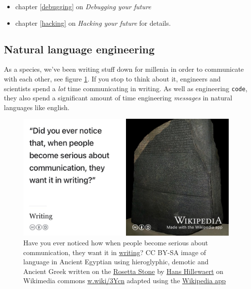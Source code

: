 \documentclass[
]{book}
\providecommand{\tightlist}{%
  \setlength{\itemsep}{0pt}\setlength{\parskip}{0pt}}
\begin{document}
\begin{enumerate}
  \begin{itemize}
  \tightlist
  \item
    chapter \ref{debugging} on \emph{Debugging your future}
  \item
    chapter \ref{hacking} on \emph{Hacking your future} for details.
  \end{itemize}
\end{enumerate}

\hypertarget{nle}{%
\subsection{Natural language engineering}\label{nle}}

As a species, we've been writing stuff down for millenia in order to communicate with each other, see figure \ref{fig:rosetta-fig}. If you stop to think about it, engineers and scientists spend a \emph{lot} time communicating in writing. As well as engineering \texttt{code}, they also spend a significant amount of time engineering \emph{messages} in natural languages like english.

\begin{figure}

{\centering \includegraphics[width=1\linewidth]{images/rosetta-stone} 

}

\caption{Have you ever noticed how when people become serious about communication, they want it in \href{https://en.wikipedia.org/wiki/Writing}{writing}? CC BY-SA image of language in Ancient Egyptian using hieroglyphic, demotic and Ancient Greek written on the \href{https://en.wikipedia.org/wiki/Rosetta_Stone}{Rosetta Stone} by \href{https://commons.wikimedia.org/wiki/Category:Photographs_by_Hans_Hillewaert}{Hans Hillewaert} on Wikimedia commons \href{https://w.wiki/3Ycn}{w.wiki/3Ycn} adapted using the \href{https://apps.apple.com/us/app/wikipedia/id324715238}{Wikipedia app}}\label{fig:rosetta-fig}
\end{figure}
\end{document}
